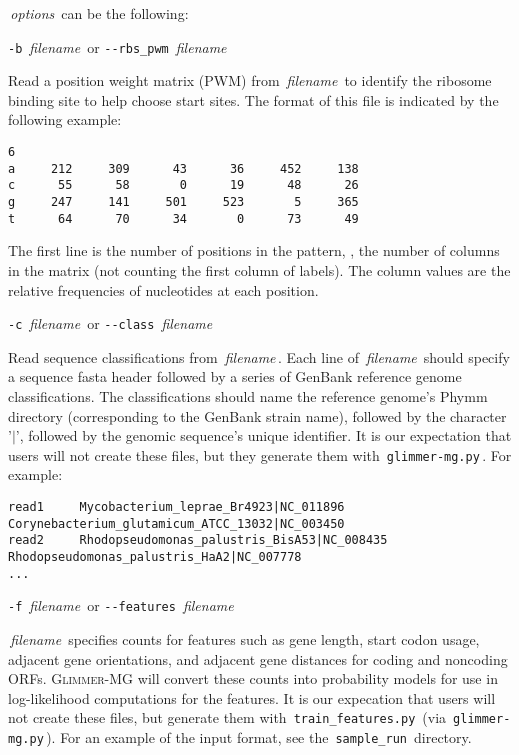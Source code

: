 \documentclass[fleqn,titlepage,11pt]{article}
\def\Desc#1{\,\mbox{\emph{#1}}\,}
\def\Gmg{\textsc{Glimmer-MG}}
\def\Pg#1{\texttt{#1}}
\begin{document}
\Desc{options} can be the following:
\bl{}\RaggedRight

\exdent
  \verb`-b` \Desc{filename} \enskip or \enskip \verb`--rbs_pwm` \Desc{filename}

  Read a position weight matrix (PWM) from \Desc{filename} to identify
  the ribosome binding site to help choose start sites.  The format of
  this file is indicated by the following example:
\BSV
\begin{verbatim}
6
a     212     309      43      36     452     138
c      55      58       0      19      48      26
g     247     141     501     523       5     365
t      64      70      34       0      73      49
\end{verbatim}
\ESV
  The first line is the number of positions in the pattern, \ie,
  the number of columns in the matrix (not counting
  the first column of labels).  The column values are the relative
  frequencies of nucleotides at each position.

\exdent
  \verb`-c` \Desc{filename} \enskip or \enskip \verb`--class` \Desc{filename}

  Read sequence classifications from \Desc{filename}. Each line of
  \Desc{filename} should specify a sequence fasta header followed by a
  series of GenBank reference genome classifications. The
  classifications should name the reference genome's Phymm directory
  (corresponding to the GenBank strain name), followed by the
  character '$|$', followed by the genomic sequence's unique
  identifier. It is our expectation that users will not create these
  files, but they generate them with \,\Pg{glimmer-mg.py}\,. For
  example:

\BSV
\footnotesize{
\begin{verbatim}
read1     Mycobacterium_leprae_Br4923|NC_011896 Corynebacterium_glutamicum_ATCC_13032|NC_003450
read2     Rhodopseudomonas_palustris_BisA53|NC_008435 Rhodopseudomonas_palustris_HaA2|NC_007778
...
\end{verbatim}
}
\ESV

\exdent
  \verb`-f` \Desc{filename} \enskip or \enskip \verb`--features` \Desc{filename}

  \Desc{filename} specifies counts for features such as gene length,
  start codon usage, adjacent gene orientations, and adjacent gene
  distances for coding and noncoding ORFs. \Gmg{} will convert these
  counts into probability models for use in log-likelihood
  computations for the features. It is our expecation that users will
  not create these files, but generate them with
  \,\Pg{train\_features.py}\, (via \,\Pg{glimmer-mg.py}\,). For an
  example of the input format, see the \,\Pg{sample\_run}\, directory.
\end{document}
